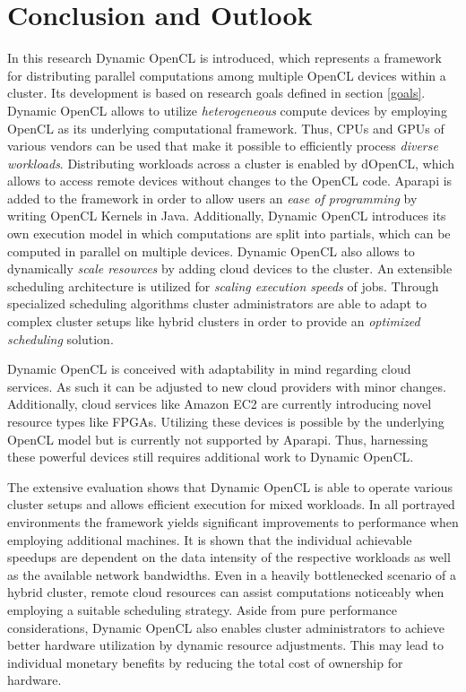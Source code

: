 \chapter{Conclusion and Outlook}
\label{conclusion}
In this research Dynamic OpenCL is introduced, which represents a framework for distributing parallel computations among multiple OpenCL devices within a cluster. Its development is based on research goals defined in section \ref{goals}. Dynamic OpenCL allows to utilize \textit{heterogeneous} compute devices by employing OpenCL as its underlying computational framework. Thus, CPUs and GPUs of various vendors can be used that make it possible to efficiently process \textit{diverse workloads}. Distributing workloads across a cluster is enabled by dOpenCL, which allows to access remote devices without changes to the OpenCL code. Aparapi is added to the framework in order to allow users an \textit{ease of programming} by writing OpenCL Kernels in Java. Additionally, Dynamic OpenCL introduces its own execution model in which computations are split into partials, which can be computed in parallel on multiple devices. Dynamic OpenCL also allows to dynamically \textit{scale resources} by adding cloud devices to the cluster. An extensible scheduling architecture is utilized for \textit{scaling execution speeds} of jobs. Through specialized scheduling algorithms cluster administrators are able to adapt to complex cluster setups like hybrid clusters in order to provide an \textit{optimized scheduling} solution.

Dynamic OpenCL is conceived with adaptability in mind regarding cloud services. As such it can be adjusted to new cloud providers with minor changes. Additionally, cloud services like Amazon EC2 are currently introducing novel resource types like FPGAs\cite{amazon_fpga}. Utilizing these devices is possible by the underlying OpenCL model but is currently not supported by Aparapi. Thus, harnessing these powerful devices still requires additional work to Dynamic OpenCL.

The extensive evaluation shows that Dynamic OpenCL is able to operate various cluster setups and allows efficient execution for mixed workloads. In all portrayed environments the framework yields significant improvements to performance when employing additional machines. It is shown that the individual achievable speedups are dependent on the data intensity of the respective workloads as well as the available network bandwidths. Even in a heavily bottlenecked scenario of a hybrid cluster, remote cloud resources can assist computations noticeably when employing a suitable scheduling strategy. Aside from pure performance considerations, Dynamic OpenCL also enables cluster administrators to achieve better hardware utilization by dynamic resource adjustments. This may lead to individual monetary benefits by reducing the total cost of ownership for hardware.

